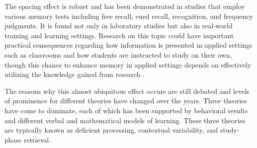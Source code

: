 


The spacing effect is robust and has been demonstrated in studies that employ various memory tests including free recall, cued recall, recognition, and frequency judgments.  It is found not only in laboratory studies but also in real-world training and learning settings.  Research on this topic could have important practical consequences regarding how information is presented in applied settings such as classrooms \cite{CarpEtal2012,DunlEtal2013,KhajEtal2014} and how students are instructed to study on their own, though this chance to enhance memory in applied settings depends on effectively utilizing the knowledge gained from research \cite{Demp1988,PashEtal2007}.

The reasons why this almost ubiquitous effect occurs are still debated and levels of prominence for different theories have changed over the years.  Three theories have come to dominate, each of which has been supported by behavioral results and different verbal and mathematical models of learning.  These three theories are typically known as deficient processing, contextual variability, and study-phase retrieval.


